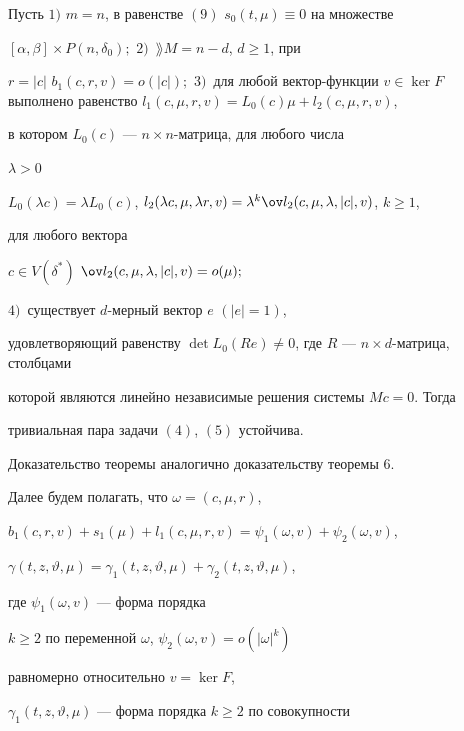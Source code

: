 


\begin{thm} 


Пусть $1)$ $m=n$, в равенстве $(9)$ $s_0(t,\mu)\equiv0$ на множестве 


$[\alpha,\beta]\times P(n,\delta_0);$ $2)$~$\rang M=n-d$, $d\ge1$, при 


$r=|c|$\; $b_1(c,r,v)=o(|c|);$ $3)$~для любой вектор-функции $v\in\ker 


F$ выполнено равенство $l_1(c,\mu,r,v)=L_0(c)\mu+l_2(c,\mu,r,v)$, 


в котором $L_0(c)$ --- $n\times n$-матрица, для любого числа 


$\lambda>0$\; 


$L_0(\lambda c)=\lambda L_0(c)$, $l_2(\lambda c,\mu,\lambda 


r,v)=\lambda^k \ov l_2(c,\mu,\lambda,|c|,v)$, $k\ge1$, 


для любого вектора 


$c\in V(\delta^*)$\; $\ov l_2(c,\mu,\lambda,|c|,v)=o(\mu);$ 


$4)$~существует $d$-мерный вектор $e$ $(|e|=1)$, 


удовлетворяющий равенству $\det L_0(Re)\ne0$, где $R$ --- $n\times 


d$-матрица, столбцами 


которой являются линейно независимые решения системы $M{}c=0$. Тогда 


тривиальная пара задачи $(4)$, $(5)$ устойчива. 


\end{thm} 


 


Доказательство теоремы аналогично доказательству теоремы 6. 


 


Далее будем полагать, что $\omega=(c,\mu,r)$, 


$b_1(c,r,v)+s_1(\mu)+l_1(c,\mu,r,v)=\psi_1(\omega,v)+\psi_2(\omega,v)$, 


$\gamma(t,z,\vartheta,\mu)=\gamma_1(t,z,\vartheta,\mu)+ 


\gamma_2(t,z,\vartheta,\mu)$, 


где $\psi_1(\omega,v)$ --- форма порядка 


$k\ge2$ по переменной $\omega$, $\psi_2(\omega,v)=o(|\omega|^k)$ 


равномерно относительно $v=\ker F$, 


$\gamma_1(t,z,\vartheta,\mu)$ --- форма порядка $k\ge2$ по совокупности 


